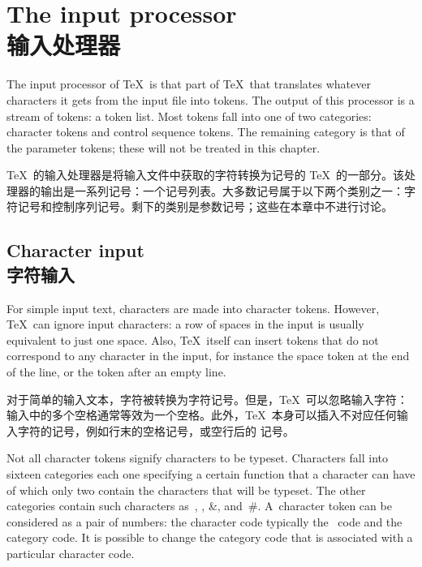 \section{The input processor\\输入处理器}

The input processor of \TeX\ is that part of \TeX\ that
translates whatever characters it gets from the input file
into tokens. The output of this processor is a stream
of tokens: a token list. Most tokens fall into one of two categories:
character tokens and control sequence tokens. 
The remaining category is that of the parameter tokens;
these will not be treated in this chapter.

\TeX\ 的输入处理器是将输入文件中获取的字符转换为记号的 \TeX\ 的一部分。该处理器的输出是一系列记号：一个记号列表。大多数记号属于以下两个类别之一：字符记号和控制序列记号。剩下的类别是参数记号；这些在本章中不进行讨论。

\subsection{Character input\\字符输入}

For simple input text, characters are made into
character tokens. However, \TeX\ can ignore input characters:
a row of spaces in the input is usually equivalent to just one
space. Also, \TeX\ itself can insert tokens that do not correspond
to any character in the input, for instance the space token
at the end of the line, or the  token after an empty line.

对于简单的输入文本，字符被转换为字符记号。但是，\TeX\ 可以忽略输入字符：输入中的多个空格通常等效为一个空格。此外，\TeX\ 本身可以插入不对应任何输入字符的记号，例如行末的空格记号，或空行后的  记号。





Not all character tokens signify characters to be typeset.
\altt
Characters fall into sixteen categories \ldash each one
specifying a certain function that a character can have \rdash 
of which only two contain the characters that will be
typeset. The other categories contain such characters 
as~, , 
\n\&, and~\n\#. A~character token can be considered
as a pair of numbers: the character code \ldash typically the \ascii\
code \rdash  and the category code.
It is possible to change
the category code that is associated with a particular
character code.

